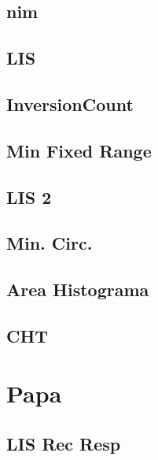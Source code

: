 \documentclass[12pt, a4paper, twoside]{article}
\begin{document}
\subsection{nim}


\subsection{LIS}


\subsection{InversionCount}


\subsection{Min Fixed Range}


\subsection{LIS 2}


\subsection{Min. Circ.}


\subsection{Area Histograma}


\subsection{CHT}




%
%

\section{Papa}

\subsection{LIS Rec Resp}

\end{document}

